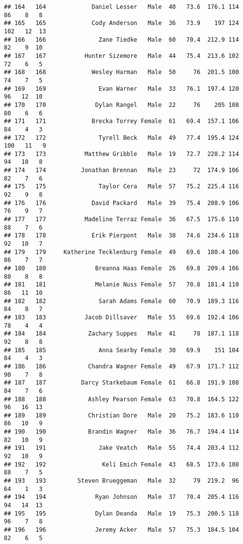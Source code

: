 \documentclass[
]{article}
\begin{document}
\begin{verbatim}
## 164   164             Daniel Lesser   Male  40   73.6  176.1 114  86    8   8
## 165   165             Cody Anderson   Male  36   73.9    197 124 102   12  13
## 166   166               Zane Tiedke   Male  60   70.4  212.9 114  82    9  10
## 167   167           Hunter Sizemore   Male  44   75.4  213.6 102  72    6   5
## 168   168             Wesley Harman   Male  50     76  201.5 100  74    7   5
## 169   169               Evan Warner   Male  33   76.1  197.4 120  96   12  10
## 170   170              Dylan Rangel   Male  22     76    205 108  80    6   6
## 171   171             Brecka Torrey Female  61   69.4  157.1 106  84    4   3
## 172   172               Tyrell Beck   Male  49   77.4  195.4 124 100   11   9
## 173   173           Matthew Gribble   Male  19   72.7  228.2 114  94   10   8
## 174   174          Jonathan Brennan   Male  23     72  174.9 106  82    7   6
## 175   175               Taylor Cera   Male  57   75.2  225.4 116  92    9   8
## 176   176             David Packard   Male  39   75.4  208.9 106  76    9   7
## 177   177           Madeline Terraz Female  36   67.5  175.6 110  88    7   6
## 178   178             Erik Pierpont   Male  38   74.6  234.6 118  92   10   7
## 179   179     Katherine Tecklenburg Female  49   69.6  180.4 106  86    7   7
## 180   180              Breanna Haas Female  26   69.8  209.4 106  80    8   8
## 181   181              Melanie Nuss Female  57   70.8  181.4 110  86   11  10
## 182   182               Sarah Adams Female  60   70.9  189.3 116  84    8   7
## 183   183           Jacob Dillsaver   Male  55   69.6  192.4 106  78    4   4
## 184   184            Zachary Suppes   Male  41     78  187.1 118  92    8   8
## 185   185               Anna Searby Female  30   69.9    151 104  84    4   3
## 186   186            Chandra Wagner Female  49   67.9  171.7 112  90    7   8
## 187   187          Darcy Starkebaum Female  61   66.8  191.9 108  84    7   6
## 188   188            Ashley Pearson Female  63   70.8  164.5 122  96   16  13
## 189   189            Christian Dore   Male  20   75.2  183.6 110  86   10   9
## 190   190            Brandin Wagner   Male  36   76.7  194.4 114  82   10   9
## 191   191               Jake Veatch   Male  55   74.4  203.4 112  92   10   9
## 192   192                Keli Emich Female  43   68.5  173.6 108  88    7   5
## 193   193         Steven Brueggeman   Male  32     79  219.2  96  64    1   3
## 194   194              Ryan Johnson   Male  37   70.4  205.4 116  94   14  13
## 195   195              Dylan Deanda   Male  19   75.3  200.5 118  96    7   8
## 196   196              Jeremy Acker   Male  57   75.3  184.5 104  82    6   5

\end{verbatim}
\end{document}

